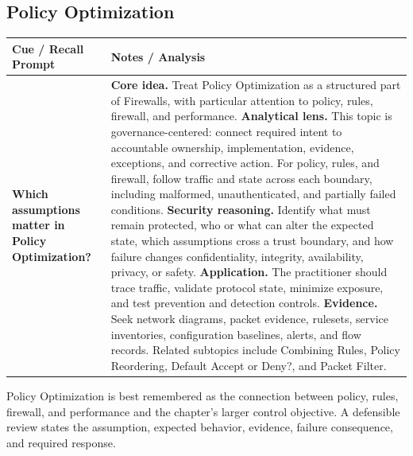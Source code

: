 \documentclass[11pt]{article}
\newcommand{\CornellHeader}{%
\rowcolor{Navy}\color{white}\bfseries Cue / Recall Prompt & \color{white}\bfseries Notes / Analysis\\\hline}
\newcommand{\CornellRow}[2]{%
\cellcolor{CueGray}\RaggedRight\textbf{#1} & \RaggedRight #2\\\hline}
\begin{document}
\subsection*{Policy Optimization}
\begin{longtable}{>{\RaggedRight\arraybackslash}p{}|>{\RaggedRight\arraybackslash}p{}}
\CornellHeader
\CornellRow{Which assumptions matter in Policy Optimization?}{\textbf{Core idea.} Treat Policy Optimization as a structured part of Firewalls, with particular attention to policy, rules, firewall, and performance. \textbf{Analytical lens.} This topic is governance-centered: connect required intent to accountable ownership, implementation, evidence, exceptions, and corrective action. For policy, rules, and firewall, follow traffic and state across each boundary, including malformed, unauthenticated, and partially failed conditions. \textbf{Security reasoning.} Identify what must remain protected, who or what can alter the expected state, which assumptions cross a trust boundary, and how failure changes confidentiality, integrity, availability, privacy, or safety. \textbf{Application.} The practitioner should trace traffic, validate protocol state, minimize exposure, and test prevention and detection controls. \textbf{Evidence.} Seek network diagrams, packet evidence, rulesets, service inventories, configuration baselines, alerts, and flow records. Related subtopics include Combining Rules, Policy Reordering, Default Accept or Deny?, and Packet Filter.}
\end{longtable}
\begin{topicsummary}
Policy Optimization is best remembered as the connection between policy, rules, firewall, and performance and the chapter's larger control objective. A defensible review states the assumption, expected behavior, evidence, failure consequence, and required response.
\end{topicsummary}
\end{document}
